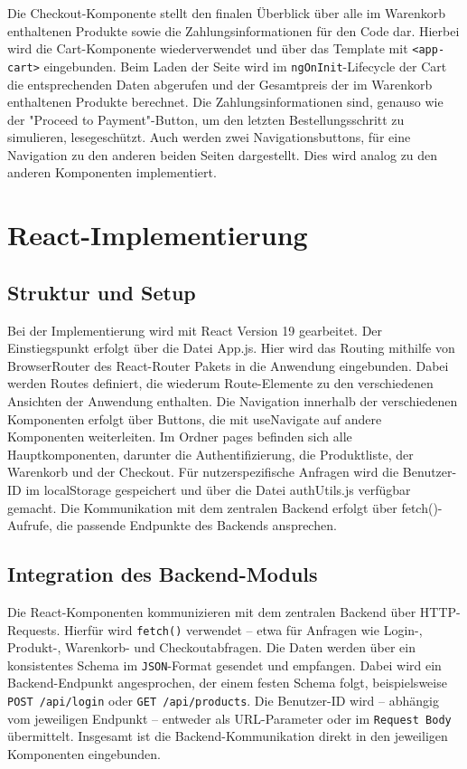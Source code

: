 \documentclass[oneside]{ausarbeitung}
\begin{document}
Die Checkout-Komponente stellt den finalen Überblick über alle im Warenkorb enthaltenen Produkte sowie die Zahlungsinformationen für den Code dar. Hierbei wird die Cart-Komponente wiederverwendet und über das Template mit \texttt{<app-cart>} eingebunden.
Beim Laden der Seite wird im \texttt{ngOnInit}-Lifecycle der Cart die entsprechenden Daten abgerufen und der Gesamtpreis der im Warenkorb enthaltenen Produkte berechnet. Die Zahlungsinformationen sind, genauso wie der "Proceed to Payment"-Button, um den letzten Bestellungsschritt zu simulieren, lesegeschützt. Auch werden zwei Navigationsbuttons, für eine Navigation zu den anderen beiden Seiten dargestellt. Dies wird analog zu den anderen Komponenten implementiert.

\section{React-Implementierung}
\subsection{Struktur und Setup}

Bei der Implementierung wird mit React Version 19 gearbeitet. Der Einstiegspunkt erfolgt über die Datei App.js. Hier wird das Routing mithilfe von BrowserRouter des React-Router Pakets in die Anwendung eingebunden. Dabei werden Routes definiert, die wiederum Route-Elemente zu den verschiedenen Ansichten der Anwendung enthalten. Die Navigation innerhalb der verschiedenen Komponenten erfolgt über Buttons, die mit useNavigate auf andere Komponenten weiterleiten. Im Ordner pages befinden sich alle Hauptkomponenten, darunter die Authentifizierung, die Produktliste, der Warenkorb und der Checkout. Für nutzerspezifische Anfragen wird die Benutzer-ID im localStorage gespeichert und über die Datei authUtils.js verfügbar gemacht. Die Kommunikation mit dem zentralen Backend erfolgt über fetch()-Aufrufe, die passende Endpunkte des Backends ansprechen.

\subsection{Integration des Backend-Moduls}

Die React-Komponenten kommunizieren mit dem zentralen Backend über HTTP-Requests. Hierfür wird \texttt{fetch()} verwendet – etwa für Anfragen wie Login-, Produkt-, Warenkorb- und Checkoutabfragen. Die Daten werden über ein konsistentes Schema im \texttt{JSON}-Format gesendet und empfangen.
Dabei wird ein Backend-Endpunkt angesprochen, der einem festen Schema folgt, beispielsweise \texttt{POST /api/login} oder \texttt{GET /api/products}. Die Benutzer-ID wird – abhängig vom jeweiligen Endpunkt – entweder als URL-Parameter oder im \texttt{Request Body} übermittelt.
Insgesamt ist die Backend-Kommunikation direkt in den jeweiligen Komponenten eingebunden.
\end{document}
